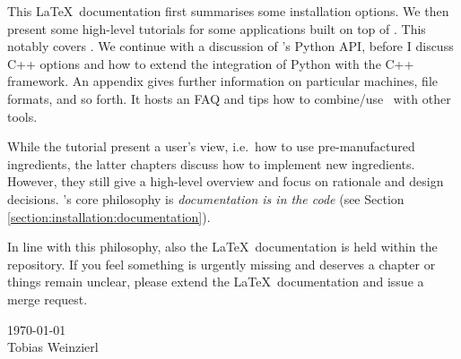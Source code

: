This \LaTeX~documentation first summarises some installation options.
We then present some high-level tutorials for some applications built on top of
\Peano.
This notably covers \ExaHyPE.
We continue with a discussion of \Peano's Python API, before I discuss C++
options and how to extend the integration of Python with the C++ framework.
An appendix gives further information on particular machines, file formats, and
so forth. 
It hosts an FAQ and tips how to combine/use \Peano\ with other tools.


While the tutorial present a user's view, i.e.~how to use pre-manufactured
ingredients, the latter chapters discuss how to implement new ingredients.
However, they still give a high-level overview and focus on rationale and design
decisions.
\Peano's core philosophy is \emph{documentation is in the code} (see Section
\ref{section:installation:documentation}).


In line with this philosophy, also the \LaTeX\ documentation is held within the
repository.
If you feel something is urgently missing and deserves a chapter or
things remain unclear, please extend the \LaTeX~documentation and issue a merge
request.



{
  \flushright
  \today 
  \\ 
  Tobias Weinzierl 
  \\
}

 
